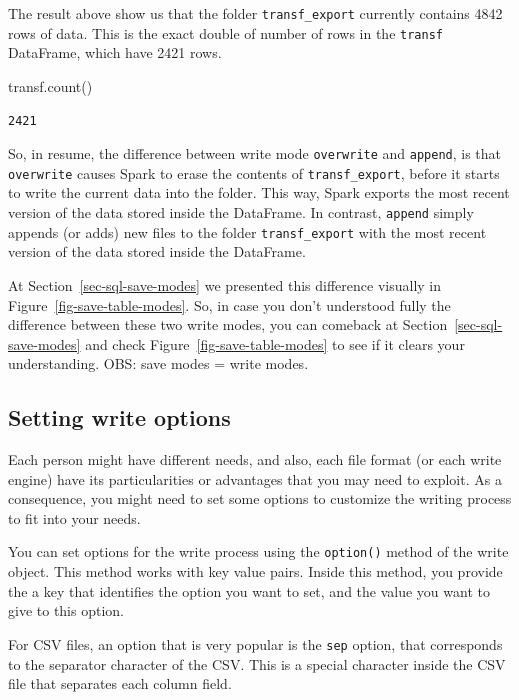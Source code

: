 \documentclass[
  11pt,
  letterpaper,
  DIV=11,
  numbers=noendperiod]{scrreprt}
\newenvironment{Shaded}{\begin{snugshade}}{\end{snugshade}}
\newcommand{\NormalTok}[1]{\textcolor[rgb]{0.00,0.23,0.31}{#1}}
\begin{document}
The result above show us that the folder \texttt{transf\_export}
currently contains 4842 rows of data. This is the exact double of number
of rows in the \texttt{transf} DataFrame, which have 2421 rows.

\begin{Shaded}
\begin{Highlighting}[]
\NormalTok{transf.count()}
\end{Highlighting}
\end{Shaded}

\begin{verbatim}
2421
\end{verbatim}

So, in resume, the difference between write mode \texttt{overwrite} and
\texttt{append}, is that \texttt{overwrite} causes Spark to erase the
contents of \texttt{transf\_export}, before it starts to write the
current data into the folder. This way, Spark exports the most recent
version of the data stored inside the DataFrame. In contrast,
\texttt{append} simply appends (or adds) new files to the folder
\texttt{transf\_export} with the most recent version of the data stored
inside the DataFrame.

At Section~\ref{sec-sql-save-modes} we presented this difference
visually in Figure~\ref{fig-save-table-modes}. So, in case you don't
understood fully the difference between these two write modes, you can
comeback at Section~\ref{sec-sql-save-modes} and check
Figure~\ref{fig-save-table-modes} to see if it clears your
understanding. OBS: save modes = write modes.

\hypertarget{setting-write-options}{%
\subsection{Setting write options}\label{setting-write-options}}

Each person might have different needs, and also, each file format (or
each write engine) have its particularities or advantages that you may
need to exploit. As a consequence, you might need to set some options to
customize the writing process to fit into your needs.

You can set options for the write process using the \texttt{option()}
method of the write object. This method works with key value pairs.
Inside this method, you provide the a key that identifies the option you
want to set, and the value you want to give to this option.

For CSV files, an option that is very popular is the \texttt{sep}
option, that corresponds to the separator character of the CSV. This is
a special character inside the CSV file that separates each column
field.
\end{document}
